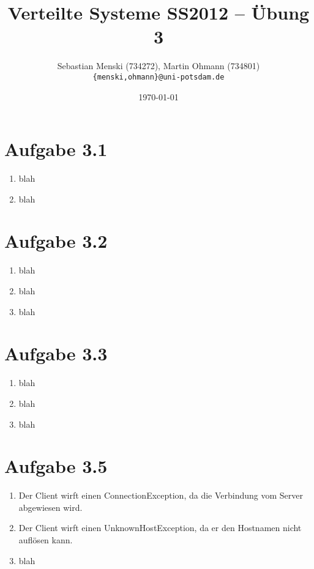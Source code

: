 \documentclass[german,12pt,a4paper]{article}
\begin{document}
\title{\textbf{Verteilte Systeme SS2012 -- Übung 3}}
\author{Sebastian Menski (734272), Martin Ohmann (734801) \\ \texttt{\{menski,ohmann\}@uni-potsdam.de}}
\date{\today}

\maketitle

\section*{Aufgabe 3.1}

\begin{enumerate}

	\item blah
	 
	\item blah

\end{enumerate}

\section*{Aufgabe 3.2}

\begin{enumerate}

	\item blah
	 
	\item blah

	\item blah
	
\end{enumerate}

\section*{Aufgabe 3.3}

\begin{enumerate}

	\item blah
	 
	\item blah

	\item blah
	
\end{enumerate}

\section*{Aufgabe 3.5}

\begin{enumerate}

	\item Der Client wirft einen ConnectionException, da die Verbindung vom Server 
	abgewiesen wird.
	 
	\item Der Client wirft einen UnknownHostException, da er den Hostnamen nicht auflösen 
	kann.

	\item blah
	
\end{enumerate}
\end{document}
